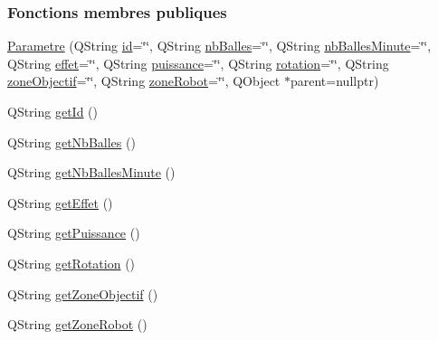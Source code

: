 \subsubsection*{Fonctions membres publiques}
\begin{DoxyCompactItemize}
\item 
\hyperlink{class_parametre_a8c0dee4edaf9b1222ec1b6e1d20fe9c5}{Parametre} (Q\+String \hyperlink{class_parametre_aa60cee81cf82cba4c7b216f15adf8a80}{id}=\char`\"{}\char`\"{}, Q\+String \hyperlink{class_parametre_a0423730a9146df04ba4de3f733818e45}{nb\+Balles}=\char`\"{}\char`\"{}, Q\+String \hyperlink{class_parametre_a6d2be86cf41aef4e099b0a7421c735c8}{nb\+Balles\+Minute}=\char`\"{}\char`\"{}, Q\+String \hyperlink{class_parametre_a1ac07f14fbc50b243b57246f662fe67f}{effet}=\char`\"{}\char`\"{}, Q\+String \hyperlink{class_parametre_aace4f0265742e479043b3e2afa33771e}{puissance}=\char`\"{}\char`\"{}, Q\+String \hyperlink{class_parametre_ab8cd796bb232cba0abe0aab5b02ae52b}{rotation}=\char`\"{}\char`\"{}, Q\+String \hyperlink{class_parametre_a5c1b739e1a70e16ca09e6752743363aa}{zone\+Objectif}=\char`\"{}\char`\"{}, Q\+String \hyperlink{class_parametre_a85c2e24c35cad5304b5e2edf7289c9c3}{zone\+Robot}=\char`\"{}\char`\"{}, Q\+Object $\ast$parent=nullptr)
\item 
Q\+String \hyperlink{class_parametre_a5831b57e743a12d6d1a8af98e9abcccb}{get\+Id} ()
\item 
Q\+String \hyperlink{class_parametre_a47d9b5efc103fa6a4a69754136ffa641}{get\+Nb\+Balles} ()
\item 
Q\+String \hyperlink{class_parametre_a5b365053ce5325ec951c837463826774}{get\+Nb\+Balles\+Minute} ()
\item 
Q\+String \hyperlink{class_parametre_aa256fc71d142a9a9cfeab2d2686f0d9d}{get\+Effet} ()
\item 
Q\+String \hyperlink{class_parametre_a11d2ada45a77abb2e99f9cde1c2d352d}{get\+Puissance} ()
\item 
Q\+String \hyperlink{class_parametre_afdfb5ca638add3954d257ff95a8d8c53}{get\+Rotation} ()
\item 
Q\+String \hyperlink{class_parametre_a2655cf5e0a69873da17dff9f51b4af70}{get\+Zone\+Objectif} ()
\item 
Q\+String \hyperlink{class_parametre_a88864c08fcd1b45a98bc6db3cdf6e29c}{get\+Zone\+Robot} ()
\end{DoxyCompactItemize}
